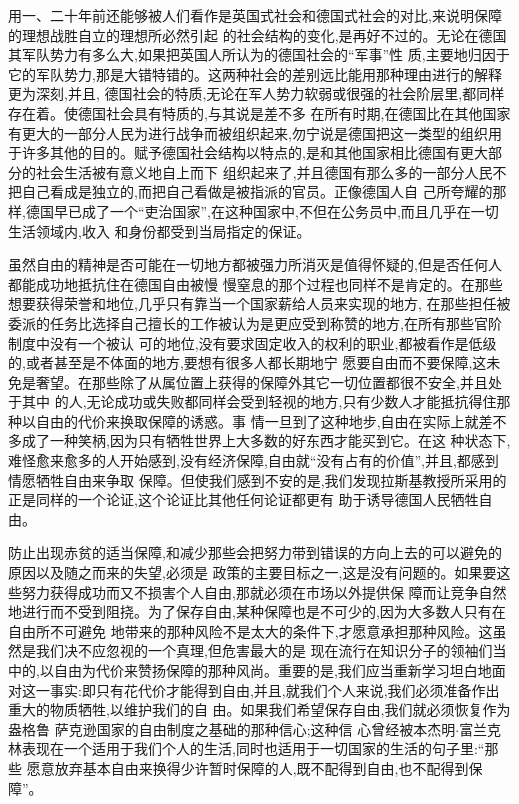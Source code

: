 ﻿\documentclass[12pt]{article}
\begin{document}
用一、二十年前还能够被人们看作是英国式社会和德国式社会的对比,来说明保障的理想战胜自立的理想所必然引起
的社会结构的变化,是再好不过的。无论在德国其军队势力有多么大,如果把英国人所认为的德国社会的``军事''性
质,主要地归因于它的军队势力,那是大错特错的。这两种社会的差别远比能用那种理由进行的解释更为深刻,并且,
德国社会的特质,无论在军人势力软弱或很强的社会阶层里,都同样存在着。使德国社会具有特质的,与其说是差不多
在所有时期,在德国比在其他国家有更大的一部分人民为进行战争而被组织起来,勿宁说是德国把这一类型的组织用
于许多其他的目的。赋予德国社会结构以特点的,是和其他国家相比德国有更大部分的社会生活被有意义地自上而下
组织起来了,并且德国有那么多的一部分人民不把自己看成是独立的,而把自己看做是被指派的官员。正像德国人自
己所夸耀的那样,德国早已成了一个``吏治国家'',在这种国家中,不但在公务员中,而且几乎在一切生活领域内,收入
和身份都受到当局指定的保证。

虽然自由的精神是否可能在一切地方都被强力所消灭是值得怀疑的,但是否任何人都能成功地抵抗住在德国自由被慢
慢窒息的那个过程也同样不是肯定的。在那些想要获得荣誉和地位,几乎只有靠当一个国家薪给人员来实现的地方,
在那些担任被委派的任务比选择自己擅长的工作被认为是更应受到称赞的地方,在所有那些官阶制度中没有一个被认
可的地位,没有要求固定收入的权利的职业,都被看作是低级的,或者甚至是不体面的地方,要想有很多人都长期地宁
愿要自由而不要保障,这未免是奢望。在那些除了从属位置上获得的保障外其它一切位置都很不安全,并且处于其中
的人,无论成功或失败都同样会受到轻视的地方,只有少数人才能抵抗得住那种以自由的代价来换取保障的诱惑。事
情一旦到了这种地步,自由在实际上就差不多成了一种笑柄,因为只有牺牲世界上大多数的好东西才能买到它。在这
种状态下,难怪愈来愈多的人开始感到,没有经济保障,自由就``没有占有的价值'',并且,都感到情愿牺牲自由来争取
保障。但使我们感到不安的是,我们发现拉斯基教授所采用的正是同样的一个论证,这个论证比其他任何论证都更有
助于诱导德国人民牺牲自由。

防止出现赤贫的适当保障,和减少那些会把努力带到错误的方向上去的可以避免的原因以及随之而来的失望,必须是
政策的主要目标之一,这是没有问题的。如果要这些努力获得成功而又不损害个人自由,那就必须在市场以外提供保
障而让竞争自然地进行而不受到阻挠。为了保存自由,某种保障也是不可少的,因为大多数人只有在自由所不可避免
地带来的那种风险不是太大的条件下,才愿意承担那种风险。这虽然是我们决不应忽视的一个真理,但危害最大的是
现在流行在知识分子的领袖们当中的,以自由为代价来赞扬保障的那种风尚。重要的是,我们应当重新学习坦白地面
对这一事实:即只有花代价才能得到自由,并且,就我们个人来说,我们必须准备作出重大的物质牺牲,以维护我们的自
由。如果我们希望保存自由,我们就必须恢复作为盎格鲁 \myrule 萨克逊国家的自由制度之基础的那种信心;这种信
心曾经被本杰明$\cdot$富兰克林表现在一个适用于我们个人的生活,同时也适用于一切国家的生活的句子里:``那些
愿意放弃基本自由来换得少许暂时保障的人,既不配得到自由,也不配得到保障''。
\end{document}

